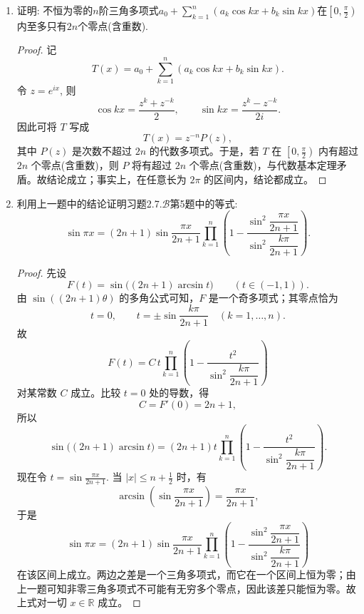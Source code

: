 \begin{4a}
\begin{enumerate}
\begin{proof}[解答]
\[\begin{split}
(\ee^x\sin x)^{(98)}&=2^{49}\,\ee^x\cos x,\\
(\ee^x\sin x)^{(99)}&=2^{49}\,\ee^x(\cos x-\sin x),\\
(\ee^x\sin x)^{(100)}&=-2^{50}\,\ee^x\sin x,
\end{split}\]
代回去即可。
\end{proof}
\item 证明: 不恒为零的\(n\)阶三角多项式\(a_0+\sum_{k=1}^{n}(a_k\cos kx+b_k\sin kx)\)在\(\left[0,\frac{\pi}{2}\right)\)内至多只有\(2n\)个零点(含重数).
\begin{proof}
记
\[T(x)=a_0+\sum_{k=1}^{n}(a_k\cos kx+b_k\sin kx).\]
令 \(z=e^{ix}\), 则
\[\cos kx=\frac{z^k+z^{-k}}2,\qquad \sin kx=\frac{z^k-z^{-k}}{2i}.\]
因此可将 \(T\) 写成
\[T(x)=z^{-n}P(z),\]
其中 \(P(z)\) 是次数不超过 \(2n\) 的代数多项式。于是，若 \(T\) 在 \(\left[0,\frac{\pi}{2}\right)\) 内有超过 \(2n\) 个零点(含重数)，则 \(P\) 将有超过 \(2n\) 个零点(含重数)，与代数基本定理矛盾。故结论成立；事实上，在任意长为 \(2\pi\) 的区间内，结论都成立。
\end{proof}
\item 利用上一题中的结论证明习题2.7.\(\boldsymbol{\mathcal{B}}\)第5题中的等式:
\[\sin \pi x=(2n+1)\sin\frac{\pi x}{2n+1}\prod_{k=1}^{n}\left(1-\frac{\sin^2\dfrac{\pi x}{2n+1}}{\sin^2\dfrac{k\pi}{2n+1}}\right).\]
\begin{proof}
先设
\[F(t)=\sin\bigl((2n+1)\arcsin t\bigr)\qquad (t\in(-1,1)).\]
由 \(\sin((2n+1)\theta)\) 的多角公式可知，\(F\) 是一个奇多项式；其零点恰为
\[t=0,\qquad t=\pm\sin\frac{k\pi}{2n+1}\quad (k=1,\dots,n).\]
故
\[F(t)=C\,t\prod_{k=1}^{n}\left(1-\frac{t^2}{\sin^2\dfrac{k\pi}{2n+1}}\right)\]
对某常数 \(C\) 成立。比较 \(t=0\) 处的导数，得
\[C=F'(0)=2n+1,\]
所以
\[\sin\bigl((2n+1)\arcsin t\bigr)=(2n+1)t\prod_{k=1}^{n}\left(1-\frac{t^2}{\sin^2\dfrac{k\pi}{2n+1}}\right).\]
现在令 \(t=\sin\frac{\pi x}{2n+1}\). 当 \(|x|\le n+\frac12\) 时，有
\[\arcsin\!\left(\sin\frac{\pi x}{2n+1}\right)=\frac{\pi x}{2n+1},\]
于是
\[\sin\pi x=(2n+1)\sin\frac{\pi x}{2n+1}\prod_{k=1}^{n}\left(1-\frac{\sin^2\dfrac{\pi x}{2n+1}}{\sin^2\dfrac{k\pi}{2n+1}}\right)\]
在该区间上成立。两边之差是一个三角多项式，而它在一个区间上恒为零；由上一题可知非零三角多项式不可能有无穷多个零点，因此该差只能恒为零。故上式对一切 \(x\in\mathbb R\) 成立。
\end{proof}
\end{enumerate}
\end{4a}
